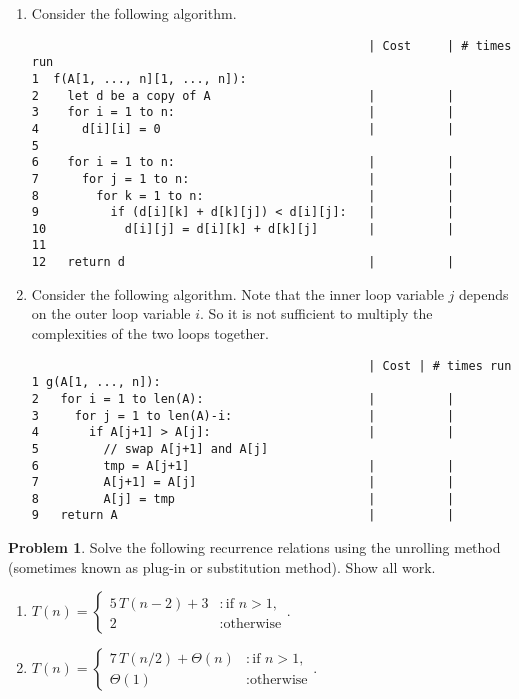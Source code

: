\documentclass[11pt]{article}
\theoremstyle{definition}
\theoremstyle{definition}
\newtheorem{problem}{Problem}
\theoremstyle{definition}
\begin{document}
\begin{enumerate}[label=(1\alph*)]
\item Consider the following algorithm. \label{1a}
\begin{verbatim}
                                               | Cost     | # times run
1  f(A[1, ..., n][1, ..., n]): 
2    let d be a copy of A                      |          |
3    for i = 1 to n:                           |          |
4      d[i][i] = 0                             |          |
5 
6    for i = 1 to n:                           |          |
7      for j = 1 to n:                         |          |
8        for k = 1 to n:                       |          |
9          if (d[i][k] + d[k][j]) < d[i][j]:   |          |
10           d[i][j] = d[i][k] + d[k][j]       |          |
11       
12   return d                                  |          |
\end{verbatim}



\newpage
\item Consider the following algorithm. Note that the inner loop variable $j$ depends on the outer loop variable $i$. So it is not sufficient to multiply the complexities of the two loops together. \label{1b}
\begin{verbatim}
                                               | Cost | # times run
1 g(A[1, ..., n]):
2   for i = 1 to len(A):                       |          |
3     for j = 1 to len(A)-i:                   |          |
4       if A[j+1] > A[j]:                      |          |
5         // swap A[j+1] and A[j]                    
6         tmp = A[j+1]                         |          |
7         A[j+1] = A[j]                        |          |
8         A[j] = tmp                           |          |
9   return A                                   |          |
\end{verbatim}
\end{enumerate}

\newpage

\begin{problem}
Solve the following recurrence relations using the unrolling method (sometimes known as plug-in or substitution method). Show all work.
\end{problem}

\begin{enumerate}[label=(2\alph*)]
\item \label{2a} $T(n) = \begin{cases} 5\, T(n-2) + 3 & : \text{if } n>1, \\ 2 & : \text{otherwise} \end{cases}$.

\newpage
\item \label{2b} $T(n) = \begin{cases} 7 \, T(n/2) + \Theta(n) & : \text{if } n>1, \\ \Theta(1) & : \text{otherwise} \end{cases}$.
\end{enumerate}
\end{document}
